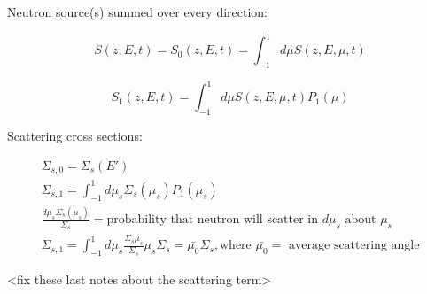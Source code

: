 \documentclass[12pt]{article}
\newcommand{\sigso}{\ensuremath{\Sigma_{s,0}}}
\newcommand{\sigsi}{\ensuremath{\Sigma_{s,1}}}
\begin{document}
Neutron source(s) summed over every direction:

\begin{equation*}
S(z,E,t) = S_0(z,E,t) = \int_{-1}^{1}d\mu S(z,E,\mu,t)
\end{equation*}

\begin{equation*}
S_1(z,E,t) = \int_{-1}^1d\mu S(z,E,\mu,t)P_1(\mu)
\end{equation*}

Scattering cross sections:

\begin{gather*}
\sigso = \Sigma_s(E') \\
\sigsi = \int_{-1}^1d\mu_s\Sigma_s(\mu_s)P_1(\mu_s) \\
\frac{d\mu_s\Sigma_s(\mu_s)}{\Sigma_s} = \text{probability that neutron will scatter in $d\mu_s$ about $\mu_s$} \\
\sigsi = \int_{-1}^1d\mu_s\frac{\Sigma_s\mu_s}{\Sigma_s}\mu_s\Sigma_s = \bar{\mu_0}\Sigma_s, 
\text{where $\bar{\mu_0} =$ average scattering angle}
\end{gather*}

<fix these last notes about the scattering term>
\end{document}
